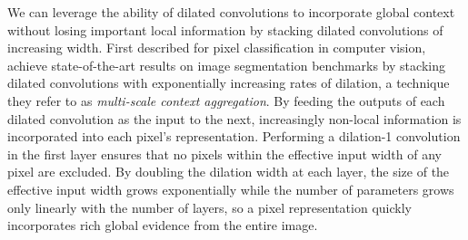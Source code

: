 We can leverage the ability of dilated convolutions to incorporate global context without losing important local information by stacking dilated convolutions of increasing width. First described for pixel classification in computer vision, \citet{yu2015multi} achieve state-of-the-art results on image segmentation benchmarks by stacking dilated convolutions with exponentially increasing rates of dilation, a technique they refer to as \emph{multi-scale context aggregation}. By feeding the outputs of each dilated convolution as the input to the next, increasingly non-local information is incorporated into each pixel's representation. Performing a dilation-1 convolution in the first layer ensures that no pixels within the effective input width of any pixel are excluded. By doubling the dilation width at each layer, the size of the effective input width grows exponentially while the number of parameters grows only linearly with the number of layers, so a pixel representation quickly incorporates rich global evidence from the entire image. 